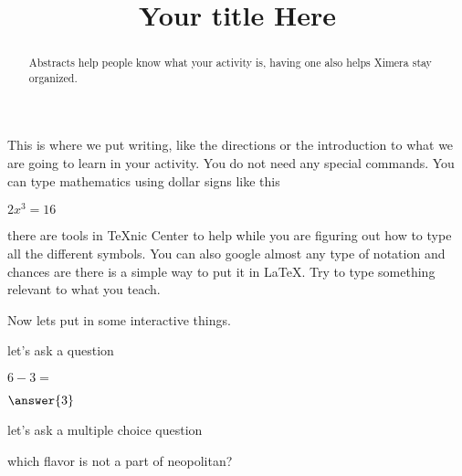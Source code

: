 \documentclass{ximera}%
\title{Your title Here}%
\begin{document}
\begin{abstract}
Abstracts help people know what your activity is, having one also helps Ximera stay organized.
\end{abstract}
\maketitle %
This is where we put writing, like the directions or the introduction to what we are going to learn in your activity. You do not need any special commands. You can type mathematics using dollar signs like this
 
$2x^3=16$

there are tools in TeXnic Center to help while you are figuring out how to type all the different symbols. You can also google almost any type of notation and chances are there is a simple way to put it in LaTeX. Try to type something relevant to what you teach.

Now lets put in some interactive things.

let's ask a question
\begin{question} $6-3=$ 
\begin{prompt}$\answer{3}$
\end{prompt}
\end{question}

let's ask a multiple choice question
\begin{question} which flavor is not a part of neopolitan?
\begin{multipleChoice}
\end{multipleChoice}
\end{question}
\end{document}
